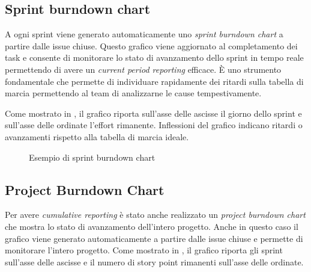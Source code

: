 \subsection{Sprint burndown chart}
A ogni sprint viene generato automaticamente uno \emph{sprint burndown chart} a partire dalle issue chiuse. Questo grafico viene aggiornato al completamento dei task e consente di monitorare lo stato di avanzamento dello sprint in tempo reale permettendo di avere un \emph{current period reporting} efficace.
È uno strumento fondamentale che permette di individuare rapidamente dei ritardi sulla tabella di marcia permettendo al team di analizzarne le cause tempestivamente.

Come mostrato in , il grafico riporta sull'asse delle ascisse il giorno dello sprint e sull'asse delle ordinate l'effort rimanente. Inflessioni del grafico indicano ritardi o avanzamenti rispetto alla tabella di marcia ideale.

\begin{figure}[htp]
  \centering
  \caption{Esempio di sprint burndown chart}
  \label{fig:sprint-burndown-chart}
\end{figure}

\subsection{Project Burndown Chart}
Per avere \emph{cumulative reporting} è stato anche realizzato un \emph{project burndown chart} che mostra lo stato di avanzamento dell'intero progetto.
Anche in questo caso il grafico viene generato automaticamente a partire dalle issue chiuse e permette di monitorare l'intero progetto.
Come mostrato in , il grafico riporta gli sprint sull'asse delle ascisse e il numero di story point rimanenti sull'asse delle ordinate.

